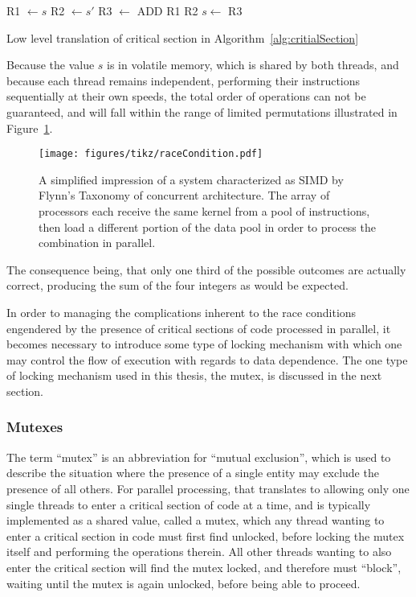 \begin{algorithm}[ht]
	\DontPrintSemicolon
\nl	R1 $\leftarrow s$\;
\nl	R2 $\leftarrow s'$\;
\nl R3 $\leftarrow$ ADD R1 R2\;
\nl	$s \leftarrow$ R3\;
	\caption{Low level translation of critical section in Algorithm~\ref{alg:critialSection} \label{alg:critialSectionLowLevel}}
\end{algorithm}%

Because the value $s$ is in volatile memory, which is shared by both threads, and because each thread remains independent, performing their instructions sequentially at their own speeds, the total order of operations can not be guaranteed, and will fall within the range of limited permutations illustrated in Figure~\ref{fig:raceCondition}.

\begin{figure}[ht]
\ffigbox
	{\texttt{[image: figures/tikz/raceCondition.pdf]}}
	{\caption[SIMD Architecture]{A simplified impression of a system characterized as SIMD by Flynn's Taxonomy of concurrent architecture. The array of processors each receive the same kernel from a pool of instructions, then load a different portion of the data pool in order to process the combination in parallel.}\label{fig:raceCondition}}
\end{figure} The consequence being, that only one third of the possible outcomes are actually correct, producing the sum of the four integers as would be expected.

In order to managing the complications inherent to the race conditions engendered by the presence of critical sections of code processed in parallel, it becomes necessary to introduce some type of locking mechanism with which one may control the flow of execution with regards to data dependence. The one type of locking mechanism used in this thesis, the mutex, is discussed in the next section.

%
%
\subsubsection{Mutexes}
\label{ch2sPPssPCsssM}
The term ``mutex'' is an abbreviation for ``mutual exclusion'', which is used to describe the situation where the presence of a single entity may exclude the presence of all others. For parallel processing, that translates to allowing only one single threads to enter a critical section of code at a time, and is typically implemented as a shared value, called a mutex, which any thread wanting to enter a critical section in code must first find unlocked, before locking the mutex itself and performing the operations therein. All other threads wanting to also enter the critical section will find the mutex locked, and therefore must ``block'', waiting until the mutex is again unlocked, before being able to proceed.

